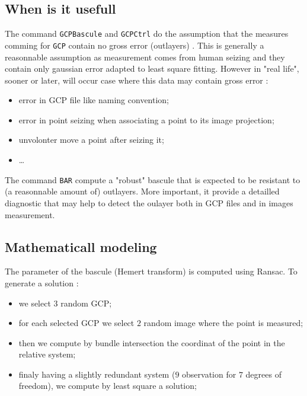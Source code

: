 \subsection{When is it usefull}

The command {\tt GCPBascule} and {\tt GCPCtrl} do the assumption that the 
measures comming for {\tt GCP} contain no gross error (outlayers) .
This is generally a reasonnable assumption as measurement comes from human seizing and they contain only
gaussian error adapted to least square fitting. However in "real life", sooner or later, will occur case
where this data may contain gross error :

\begin{itemize}
  \item error in GCP file like naming convention;
  \item error in point seizing when associating a point to its image projection;
  \item unvolonter move a point after seizing it;
  \item  \dots
\end{itemize}

The command {\tt BAR} compute a "robust" bascule  that is expected to be resistant
to (a reasonnable amount of) outlayers. More important, it provide a detailled
diagnostic that may help to detect the oulayer both in GCP files and in images
measurement.


\subsection{Mathematicall modeling}

The  parameter of the bascule (Hemert transform) is computed using Ransac. To generate
a solution :

\begin{itemize}
   \item we select $3$ random GCP;
   \item for each selected GCP we select $2$ random image where the point is measured;
   \item then we compute by bundle intersection the coordinat of the point in the relative system;
   \item finaly having a slightly  redundant system ($9$ observation for $7$ degrees of freedom), we
         compute by least square a solution;
\end{itemize}

